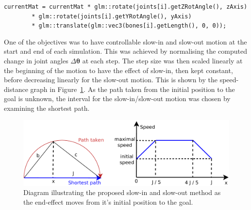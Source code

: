 \documentclass[paper=a4, fontsize=11pt]{scrartcl} %
\numberwithin{equation}{section} %
\numberwithin{figure}{section} %
\numberwithin{table}{section} %
\newcommand{\params}{\boldsymbol{\theta}}
\begin{document}

\begin{lstlisting}[float,caption=Update total transformation with current joint rotation and translation., label={lst:transformation}]
currentMat = currentMat * glm::rotate(joints[i].getZRotAngle(), zAxis)
		* glm::rotate(joints[i].getYRotAngle(), yAxis)
		* glm::translate(glm::vec3(bones[i].getLength(), 0, 0));
\end{lstlisting}

One of the objectives was to have controllable slow-in and slow-out motion at the start and end of each simulation. This was achieved by normalising the computed change in joint angles $\Delta \params$ at each step. The step size was then scaled linearly at the beginning of the motion to have the effect of slow-in, then kept constant, before decreasing linearly for the slow-out motion. This is shown by the speed-distance graph in Figure~\ref{fig:scaling}. As the path taken from the initial position to the goal is unknown, the interval for the slow-in/slow-out motion was chosen by examining the shortest path.\\
\begin{figure}[h]
\centering
\includegraphics[scale=0.5]{SpeedDiagram}
\caption{Diagram illustrating the proposed slow-in and slow-out method as the end-effect moves from it's initial position to the goal.}
\label{fig:scaling}
\end{figure}
\end{document}
